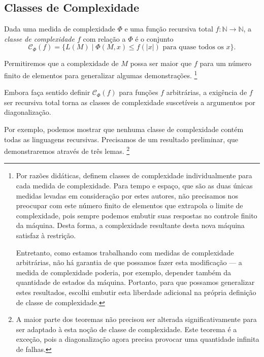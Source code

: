 \subsection{Classes de Complexidade}

\begin{definition}
    Dada uma medida de complexidade $\Phi$
    e uma função recursiva total
    $f: \mathbb N \rightarrow \mathbb N$,
    a \emph{classe de complexidade $f$} com relação a $\Phi$
    é o conjunto
    \begin{equation*}
        \mathcal C_\Phi(f) = \{ L(M) \mid \Phi(M, x) \leq f(|x|)
            \text{ para quase todos os $x$}
        \}.
    \end{equation*}
\end{definition}
Permitiremos que a complexidade de $M$
possa ser maior que $f$ para um número finito de elementos
para generalizar algumas demonstrações.%
\footnote{
    Por razões didáticas, 
    definem classes de complexidade individualmente para cada medida de complexidade.
    Para tempo e espaço,
    que são as duas únicas medidas levadas em consideração por estes autores,
    não precisamos nos preocupar com este número finito de elementos
    que extrapola o limite de complexidade,
    pois sempre podemos embutir suas respostas no controle finito da máquina.
    Desta forma,
    a complexidade resultante desta nova máquina satisfaz à restrição.

    Entretanto, como estamos trabalhando com medidas de complexidade arbitrárias,
    não há garantia de que possamos fazer esta modificação
    --- a medida de complexidade poderia, por exemplo,
    depender também da quantidade de estados da máquina.
    Portanto, para que possamos generalizar estes resultados,
    escolhi embutir esta liberdade adicional
    na própria definição de classe de complexidade.
}

Embora faça sentido definir $\mathcal C_\Phi(f)$
para funções $f$ arbitrárias,
a exigência de $f$ ser recursiva total
torna as classes de complexidade
suscetíveis a argumentos por diagonalização.

Por exemplo,
podemos mostrar que
nenhuma classe de complexidade contém todas as linguagens recursivas.
Precisamos de um resultado preliminar,
que demonstraremos através de três lemas.%
\footnote{
    A maior parte dos teoremas não precisou ser alterada significativamente
    para ser adaptado à esta noção de classe de complexidade.
    Este teorema é a exceção,
    pois a diagonalização agora precisa provocar uma quantidade infinita de falhas.
}

